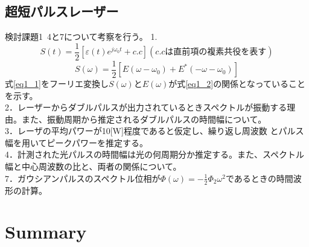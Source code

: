 \documentclass[titlepage]{jsarticle}
\begin{document}
\subsection{超短パルスレーザー}
検討課題1~4と7について考察を行う。
1.
\begin{equation}
    S(t)=\frac{1}{2}[\varepsilon(t)e^{j\omega_0 t}+c.c](c.cは直前項の複素共役を表す)
    \label{eq1_1}
\end{equation}
\begin{equation}
    S(\omega)=\frac{1}{2}[E(\omega-\omega_0)+E^{*}(-\omega-\omega_0)]
    \label{eq1_2}
\end{equation}
式\ref{eq1_1}をフーリエ変換し$S(\omega)とE(\omega)$が式\ref{eq1_2}の関係となっていることを示す。\\
2．レーザーからダブルパルスが出力されているときスペクトルが振動する理由。また、振動周期から推定されるダブルパルスの時間幅について。\\
3．レーザの平均パワーが10[W]程度であると仮定し、繰り返し周波数
とパルス幅を用いてピークパワーを推定する。\\
4．計測された光パルスの時間幅は光の何周期分か推定する。また、スペクトル幅と中心周波数の比と、両者の関係について。\\
7．ガウシアンパルスのスペクトル位相が$\Phi(\omega)=-\frac{1}{2}\Phi_2\omega^2$であるときの時間波形の計算。\\


\section{Summary}


\begin{thebibliography}{9}
  \bibitem{}
  \bibitem{}
\end{thebibliography}
\end{document}
